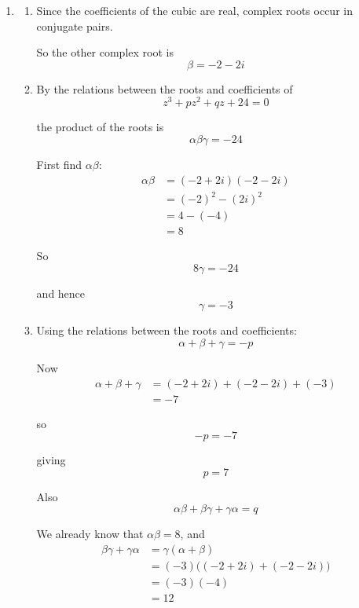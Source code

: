 \documentclass[leqno]{article}
\begin{document}
\begin{enumerate}[
  label=\textbf{\arabic*.},
  leftmargin=*,
  topsep=0pt,
  partopsep=0pt,
  parsep=0pt
]
\vspace*{10pt}

\begin{djsSolution}
\begin{enumerate}[label=\textbf{(\alph*)}]
  \item
  \begin{enumerate}[label=(\roman*)]
    \item Since the coefficients of the cubic are real, complex roots occur in conjugate pairs.

    So the other complex root is
    \[
    \beta=-2-2i
    \]

    \item By the relations between the roots and coefficients of
    \[
    z^3+pz^2+qz+24=0
    \]

    the product of the roots is
    \[
    \alpha\beta\gamma=-24
    \]

    First find $\alpha\beta$:
    \begin{align*}
    \alpha\beta&=(-2+2i)(-2-2i)\\
    &=(-2)^2-(2i)^2\\
    &=4-(-4)\\
    &=8
    \end{align*}

    So
    \[
    8\gamma=-24
    \]

    and hence
    \[
    \gamma=-3
    \]

    \item Using the relations between the roots and coefficients:
    \[
    \alpha+\beta+\gamma=-p
    \]

    Now
    \begin{align*}
    \alpha+\beta+\gamma&=(-2+2i)+(-2-2i)+(-3)\\
    &=-7
    \end{align*}

    so
    \[
    -p=-7
    \]

    giving
    \[
    p=7
    \]

    Also
    \[
    \alpha\beta+\beta\gamma+\gamma\alpha=q
    \]

    We already know that $\alpha\beta=8$, and
    \begin{align*}
    \beta\gamma+\gamma\alpha&=\gamma(\alpha+\beta)\\
    &=(-3)\bigl((-2+2i)+(-2-2i)\bigr)\\
    &=(-3)(-4)\\
    &=12
    \end{align*}


\end{enumerate}
\end{enumerate}
\end{djsSolution}
\end{enumerate}
\end{document}
